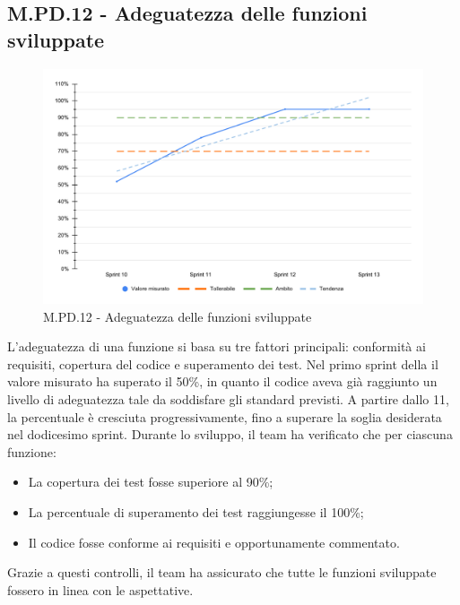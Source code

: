 \subsection{M.PD.12 - Adeguatezza delle funzioni sviluppate}

\begin{figure}[H]
  \centering
  \includegraphics[width=\textwidth]{assets/adeguatezza_funzioni.pdf}
  \caption{M.PD.12 - Adeguatezza delle funzioni sviluppate}
\end{figure}

\par L'adeguatezza di una funzione si basa su tre fattori principali: conformità ai requisiti, copertura del codice e superamento dei test. Nel primo sprint della  il valore misurato ha superato il 50\%, in quanto il codice  aveva già raggiunto un livello di adeguatezza tale da soddisfare gli standard previsti. A partire dallo  11, la percentuale è cresciuta progressivamente, fino a superare la soglia desiderata nel dodicesimo sprint. Durante lo sviluppo, il team ha verificato che per ciascuna funzione:
\begin{itemize}
  \item La copertura dei test fosse superiore al 90\%;
  \item La percentuale di superamento dei test raggiungesse il 100\%;
  \item Il codice fosse conforme ai requisiti e opportunamente commentato.
\end{itemize}

\vspace{0.5\baselineskip}
\par Grazie a questi controlli, il team ha assicurato che tutte le funzioni sviluppate fossero in linea con le aspettative.